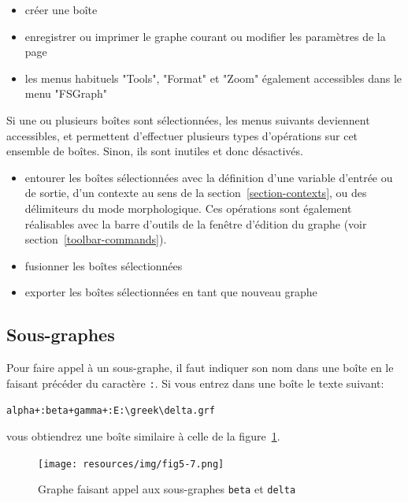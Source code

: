 \begin{itemize}
\item créer une boîte
\item enregistrer ou imprimer le graphe courant ou modifier les paramètres de la page
\item les menus habituels "Tools", "Format" et "Zoom" également accessibles dans le menu "FSGraph"
\end{itemize}
Si une ou plusieurs boîtes sont sélectionnées, les menus suivants deviennent accessibles, et
permettent d'effectuer plusieurs types d'opérations sur cet ensemble de boîtes. Sinon, ils sont
inutiles et donc désactivés. 
\begin{itemize}
\item entourer les boîtes sélectionnées avec la définition d'une variable d'entrée 
ou de sortie,  d'un
contexte au sens de la section~\ref{section-contexts}, ou des délimiteurs du mode morphologique. Ces opérations sont également réalisables avec
la barre d'outils de la fenêtre d'édition du graphe (voir section~\ref{toolbar-commands}). 
\item fusionner les boîtes sélectionnées
\item exporter les boîtes sélectionnées en tant que nouveau graphe
\end{itemize}




\subsection{Sous-graphes}
\label{section-subgraphs}
\index{\verbc{:}}
Pour faire appel à un sous-graphe, il faut indiquer son nom dans une boîte en le faisant
précéder du caractère \verb+:+. Si vous entrez dans une boîte le texte suivant:

\medskip
\verb$alpha+:beta+gamma+:E:\greek\delta.grf$

\medskip
\noindent vous obtiendrez une boîte similaire à celle de la figure~\ref{fig-subgraph-call}.

\begin{figure}[!ht]
\begin{center}
\texttt{[image: resources/img/fig5-7.png]}
\caption{Graphe faisant appel aux sous-graphes \texttt{beta} et
\texttt{delta}\label{fig-subgraph-call}}
\end{center}
\end{figure}

